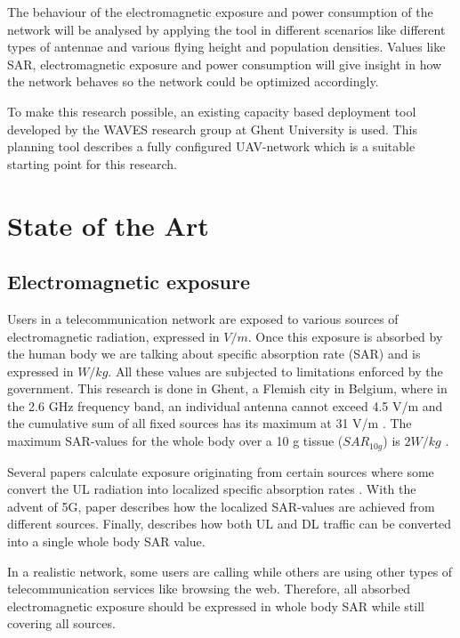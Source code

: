 \documentclass[twocolumn]{phdsymp} %
\begin{document}
The behaviour of the electromagnetic exposure and power consumption of the network will be analysed
 by applying the tool in different scenarios like different types of antennae and various flying height and population 
densities.
Values like \gls{SAR}, electromagnetic exposure and power consumption will 
 give insight in how the network behaves so the network could be optimized accordingly.

To make this research possible, 
an existing capacity based deployment tool developed by the WAVES research group at Ghent University is used.
This planning tool describes a fully configured \gls{UAV}-network which is a suitable starting point for this research.


\section{State of the Art}
\subsection{Electromagnetic exposure}

Users in a telecommunication network are exposed to various sources of electromagnetic radiation, expressed in $V/m$. Once this exposure is absorbed by the human 
body we are talking about specific absorption rate (SAR) and is expressed in $W/kg$. All these values are 
subjected to limitations enforced by the government. This research is done in Ghent, 
a Flemish city in Belgium, where in the 2.6 GHz frequency band, an individual antenna cannot exceed 4.5 V/m and the cumulative sum of all 
fixed sources has its maximum at 31 V/m \cite{J23, S13_normenBelgie}. The maximum SAR-values for the whole body 
over a 10 g tissue ($SAR_{10g}$) is $2 W/kg$ \cite{J30}. 

Several papers calculate exposure originating from certain sources  \cite{J6_originalExposureFormula, J1, J10_RDP, J10.1} 
where some convert the \gls{UL} radiation into localized specific absorption rates \cite{ J10_RDP, J10.1}. 
With the advent of 5G, paper \cite{J17_kuehn2019modelling} describes 
how the localized \gls{SAR}-values are achieved from different sources.
Finally, \cite{J22_plets2015joint} describes how both \gls{UL} and \gls{DL} traffic can be converted into a single whole body SAR value.

In a realistic network, some users are calling while others are using other types of telecommunication services like browsing the web.
Therefore, all absorbed electromagnetic exposure should be expressed in whole body SAR while still covering all sources.
\end{document}
